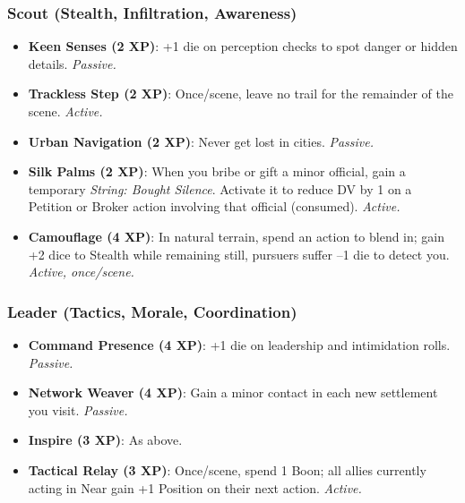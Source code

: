 \subsubsection*{Scout (Stealth, Infiltration, Awareness)}
\begin{itemize}
  \item \textbf{Keen Senses (2 XP)}: +1 die on perception checks to spot danger or hidden details. \textit{Passive.}
  \item \textbf{Trackless Step (2 XP)}: Once/scene, leave no trail for the remainder of the scene. \textit{Active.}
  \item \textbf{Urban Navigation (2 XP)}: Never get lost in cities. \textit{Passive.}
  \item \textbf{Silk Palms (2 XP)}: When you bribe or gift a minor official, gain a temporary \textit{String: Bought Silence}. Activate it to reduce DV by 1 on a Petition or Broker action involving that official (consumed). \textit{Active.}
  \item \textbf{Camouflage (4 XP)}: In natural terrain, spend an action to blend in; gain +2 dice to Stealth while remaining still, pursuers suffer –1 die to detect you. \textit{Active, once/scene.}
\end{itemize}

\subsubsection*{Leader (Tactics, Morale, Coordination)}
\begin{itemize}
  \item \textbf{Command Presence (4 XP)}: +1 die on leadership and intimidation rolls. \textit{Passive.}
  \item \textbf{Network Weaver (4 XP)}: Gain a minor contact in each new settlement you visit. \textit{Passive.}
  \item \textbf{Inspire (3 XP)}: As above.
  \item \textbf{Tactical Relay (3 XP)}: Once/scene, spend 1 Boon; all allies currently acting in Near gain +1 Position on their next action. \textit{Active.}
\end{itemize}

